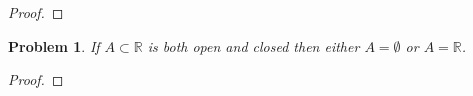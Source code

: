 \documentclass[12pt]{article}
\newtheorem{problem}{Problem}
\newcommand{\RR}{\ensuremath{\mathbb R}}
\begin{document}
\begin{proof}
\end{proof}


\begin{problem} %
If $A \subset \RR$ is both open and closed then either $A=\emptyset$ or $A=\RR$.
\end{problem}


\begin{proof}
\end{proof}
\end{document}
